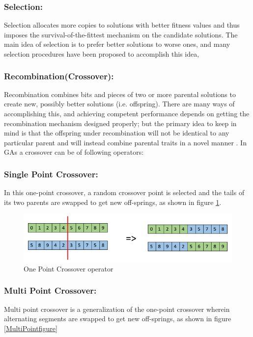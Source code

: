 \subsubsection{Selection:} 
Selection allocates more copies to solutions with better fitness values and thus imposes the survival-of-the-fittest mechanism on the candidate solutions. The main idea of selection is to prefer better solutions to worse ones, and many selection procedures have been proposed to accomplish this idea, 
\subsubsection{Recombination(Crossover):}
Recombination combines bits and pieces of two or more parental solutions to create new, possibly better solutions (i.e. offspring). There are many ways of accomplishing this, and achieving competent performance depends on getting the recombination mechanism designed properly; but the primary idea to keep in mind is
that the offspring under recombination will not be identical to any particular parent and will instead combine parental traits in a novel manner \cite{goldberg1999using}.
\newpage
In GAs a crossover can be of following operators:
\subsubsection{Single Point Crossover:}
In this one-point crossover, a random crossover point is selected and the tails of its two parents are swapped to get new off-springs, as shown in figure \ref{onePointfigure}.

\begin{figure}[h]
	\centering
	\includegraphics[scale=0.45]{imagenes/one_point_crossover.png}
    \caption{One Point Crossover operator}
    \label{onePointfigure}
\end{figure}

\subsubsection{Multi Point Crossover:}
Multi point crossover is a generalization of the one-point crossover wherein alternating segments are swapped to get new off-springs, as shown in figure \ref{MultiPointfigure}


